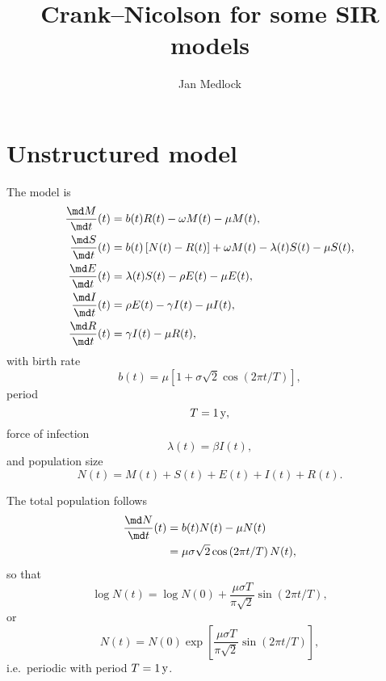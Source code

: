 \documentclass{jpmarticle}
\title{Crank--Nicolson for some SIR models}
\author{Jan Medlock}
\begin{document}
\maketitle

\section{Unstructured model}

The model is
\begin{equation}
  \label{model_unstructured}
  \begin{split}
    \frac{\md M}{\md t}(t) &=
    b(t) R(t) - \omega M(t) - \mu M(t),
    \\
    \frac{\md S}{\md t}(t) &=
    b(t) \left[N(t) - R(t)\right] + \omega M(t) - \lambda(t) S(t) - \mu S(t),
    \\
    \frac{\md E}{\md t}(t) &=
    \lambda(t) S(t) - \rho E(t) - \mu E(t),
    \\
    \frac{\md I}{\md t}(t) &=
    \rho E(t) - \gamma I(t) - \mu I(t),
    \\
    \frac{\md R}{\md t}(t) &=
    \gamma I(t) - \mu R(t),
  \end{split}
\end{equation}
with birth rate
\begin{equation}
  b(t) = \mu \left[
    1 + \sigma \sqrt{2} \cos\left(2 \pi t / T\right)
  \right],
\end{equation}
period
\begin{equation}
  T = \unit[1]y,
\end{equation}
force of infection
\begin{equation}
  \lambda(t) = \beta I(t),
\end{equation}
and population size
\begin{equation}
  N(t) = M(t) + S(t) + E(t) + I(t) + R(t).
\end{equation}

The total population follows
\begin{equation}
  \begin{split}
    \frac{\md N}{\md t}(t)
    &= b(t) N(t) - \mu N(t)
    \\
    &= \mu \sigma \sqrt{2} \cos\left(2 \pi t / T\right) N(t),
  \end{split}
\end{equation}
so that
\begin{equation}
  \log N(t) = \log N(0)
  + \frac{\mu \sigma T}{\pi \sqrt{2}}
  \sin\left(2 \pi t / T\right),
\end{equation}
or
\begin{equation}
  N(t) = N(0) \exp\left[
    \frac{\mu \sigma T}{\pi \sqrt{2}}
    \sin\left(2 \pi t / T\right)
  \right],
\end{equation}
i.e.~periodic with period $T = \unit[1]{y}$.
\end{document}
